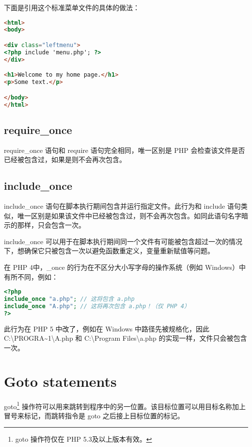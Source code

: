 下面是引用这个标准菜单文件的具体的做法：

\begin{lstlisting}[language=HTML]
<html>
<body>

<div class="leftmenu">
<?php include 'menu.php'; ?>
</div>

<h1>Welcome to my home page.</h1>
<p>Some text.</p>

</body>
</html>
\end{lstlisting}


\subsection{require\_once}

require\_once 语句和 require 语句完全相同，唯一区别是 PHP 会检查该文件是否已经被包含过，如果是则不会再次包含。

\subsection{include\_once}

include\_once 语句在脚本执行期间包含并运行指定文件。此行为和 include 语句类似，唯一区别是如果该文件中已经被包含过，则不会再次包含。如同此语句名字暗示的那样，只会包含一次。

include\_once 可以用于在脚本执行期间同一个文件有可能被包含超过一次的情况下，想确保它只被包含一次以避免函数重定义，变量重新赋值等问题。

在 PHP 4中，\_once 的行为在不区分大小写字母的操作系统（例如 Windows）中有所不同，例如：


\begin{lstlisting}[language=PHP]
<?php
include_once "a.php"; // 这将包含 a.php
include_once "A.php"; // 这将再次包含 a.php！（仅 PHP 4）
?>
\end{lstlisting}

此行为在 PHP 5 中改了，例如在 Windows 中路径先被规格化，因此 C:\textbackslash PROGRA\~{}1\textbackslash A.php 和 C:\textbackslash Program Files\textbackslash a.php 的实现一样，文件只会被包含一次。


\section{Goto statements}

goto\footnote{goto 操作符仅在 PHP 5.3及以上版本有效。} 操作符可以用来跳转到程序中的另一位置。该目标位置可以用目标名称加上冒号来标记，而跳转指令是 goto 之后接上目标位置的标记。

